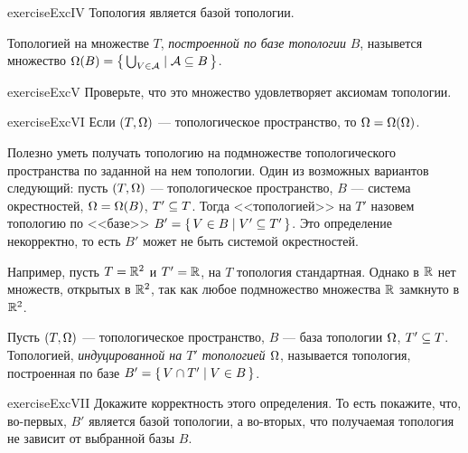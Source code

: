 \documentclass[main]{subfiles}
\begin{document}
\begin{restatable}{exercise}{ExcIV}
	Топология является базой топологии.
\end{restatable}

\begin{definition}
	Топологией на множестве $ T $, \emph{построенной по базе топологии} $ B $, назывется множество
	$ \Omega(B) = \left\{\, \bigcup_{V \in \mathcal{A}} \mid \mathcal{A} \subseteq B \,\right\} $.
\end{definition}

\begin{restatable}{exercise}{ExcV}
	Проверьте, что это множество удовлетворяет аксиомам топологии.
\end{restatable}

\begin{restatable}{exercise}{ExcVI}
	Если $ (T, \Omega) $ --- топологическое пространство, то $ \Omega = \Omega(\Omega) $.
\end{restatable}

Полезно уметь получать топологию на подмножестве топологического пространства по заданной на нем топологии.
Один из возможных вариантов следующий: пусть $ (T, \Omega) $ --- топологическое пространство, $ B $ --- система окрестностей,
$ \Omega = \Omega(B) $, $ T' \subseteq T $. Тогда <<топологией>> на $ T' $ назовем топологию по <<базе>>
$ B' = \left\{\, V \in B \mid V' \subseteq T' \,\right\} $. Это определение некорректно, то есть $ B' $ может не быть системой
окрестностей.

\begin{example}
	Например, пусть $ T = \mathbb{R}^2 $ и $ T' = \mathbb{R} $, на $ T $ топология стандартная. Однако в $ \mathbb{R} $ нет
	множеств, открытых в $ \mathbb{R}^2 $, так как любое подмножество множества $ \mathbb{R} $ замкнуто в $ \mathbb{R}^2 $.
\end{example}

\begin{definition}
	Пусть $ (T, \Omega) $ --- топологическое пространство, $ B $ --- база топологии $ \Omega $, $ T' \subseteq T $.
	Топологией, \emph{индуцированной на $ T' $ топологией $ \Omega $}, называется топология, построенная по базе
	$ B' = \left\{\, V \cap T' \mid V \in B \,\right\} $.
\end{definition}

\begin{restatable}{exercise}{ExcVII}
	Докажите корректность этого определения. То есть покажите, что, во-первых, $ B' $ является базой топологии, а
	во-вторых, что получаемая топология не зависит от выбранной базы $ B $.
\end{restatable}
\end{document}
